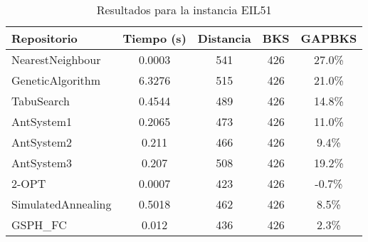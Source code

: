 \begin{table}[H]
\centering
\caption{Resultados para la instancia EIL51}
\begin{tabular}{|l|c|c|c|c|}
\hline
\textbf{Repositorio} & \textbf{Tiempo (s)} & \textbf{Distancia} & \textbf{BKS} & \textbf{GAPBKS} \\ 
\hline
NearestNeighbour & 0.0003 & 541 & 426 & 27.0\% \\ 
GeneticAlgorithm & 6.3276 & 515 & 426 & 21.0\% \\ 
TabuSearch & 0.4544 & 489 & 426 & 14.8\% \\ 
AntSystem1 & 0.2065 & 473 & 426 & 11.0\% \\ 
AntSystem2 & 0.211 & 466 & 426 & 9.4\% \\ 
AntSystem3 & 0.207 & 508 & 426 & 19.2\% \\ 
2-OPT & 0.0007 & 423 & 426 & -0.7\% \\ 
SimulatedAnnealing & 0.5018 & 462 & 426 & 8.5\% \\ 
GSPH_FC & 0.012 & 436 & 426 & 2.3\% \\ 
\hline
\end{tabular}
\end{table}
